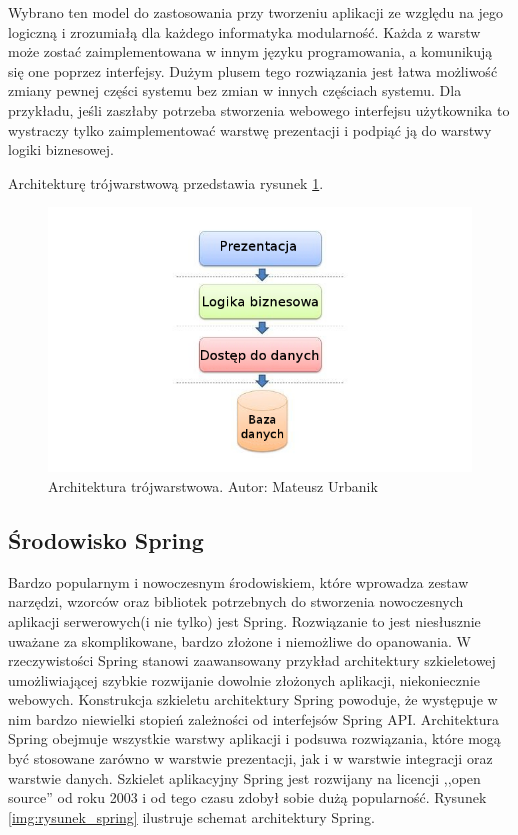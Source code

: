 Wybrano ten model do zastosowania przy tworzeniu aplikacji ze względu na jego logiczną i zrozumiałą dla każdego informatyka modularność. Każda z warstw może zostać zaimplementowana w innym języku programowania, a komunikują się one poprzez interfejsy. Dużym plusem tego rozwiązania jest łatwa możliwość zmiany pewnej części systemu bez zmian w innych częściach systemu. Dla przykładu, jeśli zaszłaby potrzeba stworzenia webowego interfejsu użytkownika to wystraczy tylko zaimplementować warstwę prezentacji i podpiąć ją do warstwy logiki biznesowej.

Architekturę trójwarstwową przedstawia rysunek \ref{img:rysunek_3layer}.
\begin{figure}[!ht]
\centering	
\includegraphics[scale=0.5]{images/3layer-architect}
\caption[Rysunek przedstawiający model architektury trójwarstwowej]{Architektura trójwarstwowa. Autor: Mateusz Urbanik}
\label{img:rysunek_3layer}
\end{figure}

\subsection{Środowisko Spring}
\label{sec:modelArchitekturySpring}
Bardzo popularnym i nowoczesnym środowiskiem, które wprowadza zestaw narzędzi, wzorców oraz bibliotek potrzebnych do stworzenia nowoczesnych aplikacji serwerowych(i nie tylko) jest Spring. Rozwiązanie to jest niesłusznie uważane za skomplikowane, bardzo złożone i niemożliwe do opanowania. W rzeczywistości Spring stanowi zaawansowany przykład architektury szkieletowej umożliwiającej szybkie rozwijanie dowolnie złożonych aplikacji, niekoniecznie webowych. Konstrukcja szkieletu architektury Spring powoduje, że występuje w nim bardzo niewielki stopień zależności od interfejsów Spring API. Architektura Spring obejmuje wszystkie warstwy aplikacji i podsuwa rozwiązania, które mogą być stosowane zarówno w warstwie prezentacji, jak i w warstwie integracji oraz warstwie danych. Szkielet aplikacyjny Spring jest rozwijany na licencji ,,open source'' od roku 2003 i od tego czasu zdobył sobie dużą popularność\cite{bruce_spring}. Rysunek \ref{img:rysunek_spring} ilustruje schemat architektury Spring.

